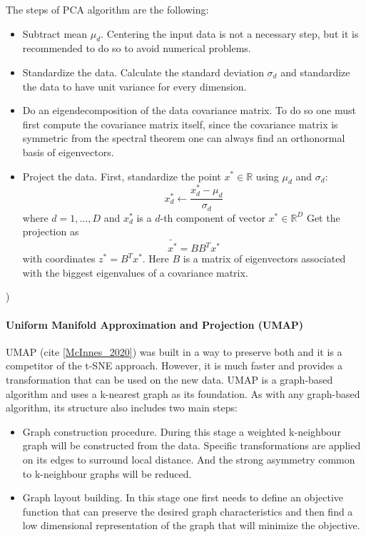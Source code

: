 The steps of PCA algorithm are the following:
\begin{itemize}
    \item Subtract mean $\mu_d$. Centering the input data is not a necessary step, but it is recommended to do so to avoid numerical problems.
    \item Standardize the data. Calculate the standard deviation $\sigma_d$ and standardize the data to have unit variance for every dimension. 
    \item Do an eigendecomposition of the data covariance matrix. To do so one must first compute the covariance matrix itself, since the covariance matrix is symmetric from the spectral theorem one can always find an orthonormal basis of eigenvectors. 
    \item Project the data. First, standardize the point $x^* \in \mathbb{R}$ using $\mu_d$ and $\sigma_d$:
        \begin{equation}
            x^*_d  \leftarrow \frac{x^*_d - \mu_d}{\sigma_d}
        \end{equation}
        where $d = 1, ..., D$ and $x^*_d$ is a $d$-th component of vector $x^* \in \mathbb{R}^D$
    Get the projection as 
    \begin{equation}
        \tilde{x^*} = BB^T x^*
    \end{equation}
    with coordinates $z^* = B^Tx^*$. Here $B$ is a matrix of eigenvectors associated with the biggest eigenvalues of a covariance matrix.
\end{itemize}\cite{mml_book})

\paragraph{Uniform Manifold Approximation and Projection (UMAP)}
UMAP (cite \ref{McInnes_2020}) was built in a way to preserve both and it is a competitor of the t-SNE approach. However, it is much faster and provides a transformation that can be used on the new data. UMAP is a graph-based algorithm and uses a k-nearest graph as its foundation. As with any graph-based algorithm, its structure also includes two main steps: 

\begin{itemize}
    \item Graph construction procedure. During this stage a weighted k-neighbour graph will be constructed from the data. Specific transformations are applied on its edges to surround local distance. And the strong asymmetry common to k-neighbour graphs will be reduced.
    \item Graph layout building. In this stage one first needs to define an objective function that can preserve the desired graph characteristics and then find a low dimensional representation of the graph that will minimize the objective.
\end{itemize}

